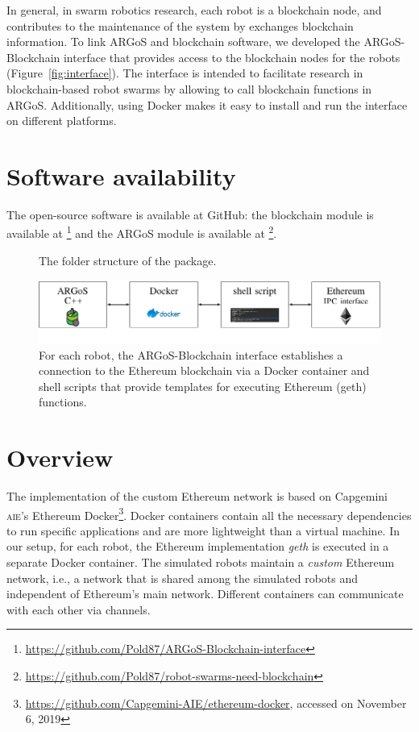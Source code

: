 \documentclass{article}
\begin{document}
In general, in swarm robotics research, each robot is a blockchain
node, and contributes to the maintenance of the system by exchanges
blockchain information. To link ARGoS and blockchain software, we
developed the ARGoS-Blockchain interface that provides access to the
blockchain nodes for the robots (Figure~\ref{fig:interface}). The
interface is intended to facilitate research in blockchain-based robot
swarms by allowing to call blockchain functions in
ARGoS. Additionally, using Docker makes it easy to install and run the
interface on different platforms.


\section{Software availability}

The open-source software is available at GitHub: the blockchain module
is available at
\footnote{\url{https://github.com/Pold87/ARGoS-Blockchain-interface}}
and the ARGoS module is available at
\footnote{\url{https://github.com/Pold87/robot-swarms-need-blockchain}}.

\begin{figure}[t]%
{}
\label{fig:folderstructure}  
\caption{The folder structure of the package.}
\end{figure}
\begin{figure}
  \centering
    \includegraphics[width=\textwidth]{overview}
  \caption{For each robot, the ARGoS-Blockchain interface establishes
    a connection to the Ethereum blockchain via a Docker container and
    shell scripts that provide templates for executing Ethereum (geth)
    functions.}
  \label{fig:overview}  
\end{figure}

\section{Overview}

The implementation of the custom Ethereum network is based on
Capgemini \textsc{aie}'s Ethereum
Docker\footnote{\url{https://github.com/Capgemini-AIE/ethereum-docker},
  accessed on November 6, 2019}. Docker containers
\citep{Mer2014:linux} contain all the necessary dependencies to run
specific applications and are more lightweight than a virtual
machine. In our setup, for each robot, the Ethereum implementation
\emph{geth} is executed in a separate Docker container. The simulated
robots maintain a \emph{custom} Ethereum network, i.e., a network that
is shared among the simulated robots and independent of Ethereum's
main network. Different containers can communicate with each other via
channels.
\end{document}

